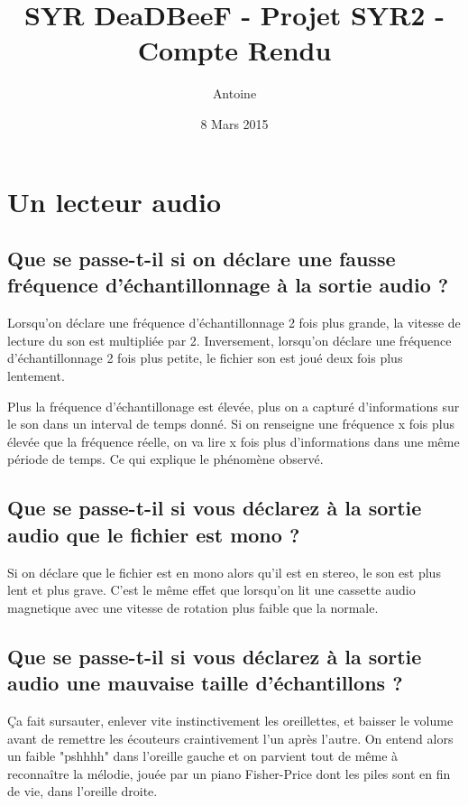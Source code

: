 \documentclass[a4paper,10pt,openany,oneside]{report}
\title{SYR DeaDBeeF - Projet SYR2 - Compte Rendu}
\author{Antoine \bsc{Pinsard}}
\date{8 Mars 2015}
\begin{document}
\maketitle

\section{Un lecteur audio}

\subsection{Que se passe-t-il si on déclare une fausse fréquence
            d'échantillonnage à la sortie audio ?}

Lorsqu'on déclare une fréquence d'échantillonnage 2 fois plus grande, la
vitesse de lecture du son est multipliée par 2. Inversement, lorsqu'on déclare
une fréquence d'échantillonnage 2 fois plus petite, le fichier son est joué
deux fois plus lentement.

Plus la fréquence d'échantillonage est élevée, plus on a capturé d'informations
sur le son dans un interval de temps donné. Si on renseigne une fréquence x
fois plus élevée que la fréquence réelle, on va lire x fois plus d'informations
dans une même période de temps. Ce qui explique le phénomène observé.

\subsection{Que se passe-t-il si vous déclarez à la sortie audio que le fichier
            est mono ?}

Si on déclare que le fichier est en mono alors qu'il est en stereo, le son est
plus lent et plus grave. C'est le même effet que lorsqu'on lit une cassette
audio magnetique avec une vitesse de rotation plus faible que la normale.

\subsection{Que se passe-t-il si vous déclarez à la sortie audio une mauvaise
            taille d'échantillons ?}

Ça fait sursauter, enlever vite instinctivement les oreillettes, et baisser le
volume avant de remettre les écouteurs craintivement l'un après l'autre. On
entend alors un faible "pshhhh" dans l'oreille gauche et on parvient tout de
même à reconnaître la mélodie, jouée par un piano Fisher-Price dont les piles
sont en fin de vie, dans l'oreille droite.
\end{document}
